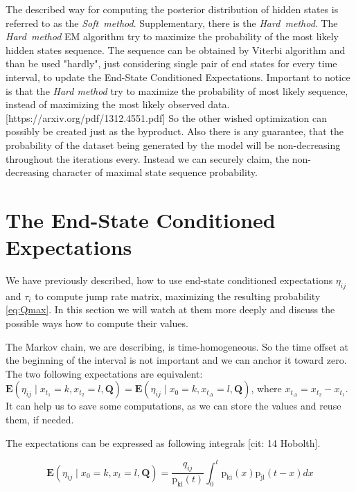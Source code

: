 \documentclass[thesis=M,english]{FITthesis}[2012/10/20]
\newcommand{\matr}[1]{\mathbf{#1}}
\begin{document}
The described way for computing the posterior distribution of hidden states is referred to as the \textit{Soft~method}. Supplementary, there is the \textit{Hard~method}. The \textit{Hard~method} EM algorithm try to maximize the probability of the most likely hidden states sequence. The sequence can be obtained by Viterbi algorithm and than be used "hardly", just considering single pair of end states for every time interval, to update the End-State Conditioned Expectations. Important to notice is that the \textit{Hard method} try to maximize the probability of most likely sequence, instead of maximizing the most likely observed data. [https://arxiv.org/pdf/1312.4551.pdf] So the other wished optimization can possibly be created just as the byproduct. Also there is any guarantee, that the probability of the dataset being generated by the model will be non-decreasing throughout the iterations every. Instead we can securely claim, the non-decreasing character of maximal state sequence probability.           

\section{The End-State Conditioned Expectations}\label{sec:endexp}

We have previously described, how to use end-state conditioned expectations $\eta_{ij}$ and $\tau_i$ to compute jump rate matrix, maximizing the resulting probability \eqref{eq:Qmax}. In this section we will watch at them more deeply and discuss the possible ways how to compute their values.

The Markov chain, we are describing, is time-homogeneous. So the time offset at the beginning of the interval is not important and we can anchor it toward zero. The two following expectations are equivalent: $\mathbf{E}(\eta_{ij} \mid x_{t_1} = k, x_{t_2} = l, \matr{ Q } ) = \mathbf{E}(\eta_{ij} \mid x_0 = k, x_{t_\Delta} = l, \matr{ Q } )$, where $x_{t_\Delta} = x_{t_2} - x_{t_1}$. It can help us to save some computations, as we can store the values and reuse them, if needed.

The expectations can be expressed as following integrals [cit: 14 Hobolth].   

\begin{equation}\label{eq:exp1}
\mathbf{E}(\eta_{ij} \mid x_0 = k, x_t = l, \matr{ Q } ) = \frac{ q_{ij} }{ \mathrm{p_{kl}}(t) } 
\int_{0}^{t} \mathrm{p_{ki}}(x) \mathrm{p_{jl}}(t-x) dx
\end{equation}
\end{document}

